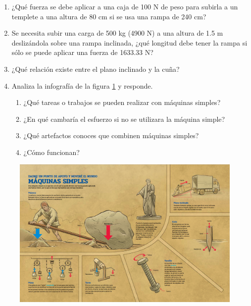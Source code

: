 \documentclass[11pt]{book}
\begin{document}
\begin{boxK}
  \begin{enumerate}
    \item ¿Qué fuerza se debe aplicar a una caja de 100 N de peso para subirla a
          un templete a una altura de 80 cm si se usa una rampa de 240 cm?
    \item Se necesita subir una carga de 500 kg (4900 N) a una altura de 1.5 m
          deslizándola sobre una rampa inclinada, ¿qué longitud debe tener la rampa si
          sólo se puede aplicar una fuerza de 1633.33 N?
    \item ¿Qué relación existe entre el plano inclinado y la cuña?
    \item Analiza la infografía de la figura \ref{fig:SINFI2SB_1E16_U1_S4_b_info} y responde.
          \begin{enumerate}
            \item ¿Qué tareas o trabajos se pueden realizar con máquinas simples?
            \item ¿En qué cambar\'ia el esfuerzo si no se utilizara la máquina simple?
            \item ¿Qué artefactos conoces que combinen máquinas simples?
            \item ¿Cómo funcionan?
          \end{enumerate}
  \end{enumerate}
\end{boxK}

\newpage

\begin{landscape}
  \thispagestyle{empty}
  \begin{figure}[H]
    \centering
    \includegraphics[width=\linewidth]{SINFI2SB_1E16_U1_S4_b_info.png}
    \label{fig:SINFI2SB_1E16_U1_S4_b_info}
  \end{figure}
\end{landscape}
\end{document}
